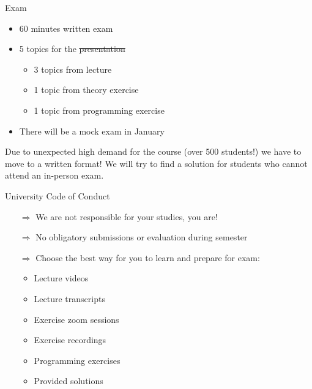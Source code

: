 \begin{frame}[t]{Exam}

    \begin{itemize}
        \setlength\itemsep{0.3cm}
        \item 60 minutes written exam
        \item 5 topics for the \st{presentation}
            \vspace{0.3cm}
            \begin{itemize}
                \setlength\itemsep{0.3cm}
                \item 3 topics from lecture
                \item 1 topic from theory exercise
                \item 1 topic from programming exercise
            \end{itemize}
        \item There will be a mock exam in January
    \end{itemize}

    \vspace{0.3cm}
    \begin{center}
        \alert{Due to unexpected high demand for the course (over 500 students!) we have to move to a written format!
        We will try to find a solution for students who cannot attend an in-person exam.}
    \end{center}
    
\end{frame}

\begin{frame}[t]{University Code of Conduct}

    \begin{itemize}
        \setlength\itemsep{0.3cm}
        \item[$\Rightarrow$] We are not responsible for your studies, you are!
        \item[$\Rightarrow$] No obligatory submissions or evaluation during semester
        \item[$\Rightarrow$] Choose the best way for you to learn and prepare for exam:
              \vspace{0.3cm}
              \begin{itemize}
                  \setlength\itemsep{0.1cm}
                  \item Lecture videos
                  \item Lecture transcripts
                  \item Exercise zoom sessions
                  \item Exercise recordings
                  \item Programming exercises
                    \item Provided solutions
              \end{itemize}
    \end{itemize}
\end{frame}


